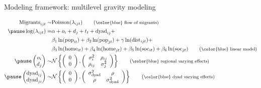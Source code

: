 \documentclass{beamer}
\begin{document}
\begin{frame}[fragile]{Modeling framework: multilevel gravity modeling}
\begin{small}
  \begin{align}
  	\text{Migrants}_{ijt} \sim & \text{Poisson}(\lambda_{ijt})\tag{\footnotesize \color{blue} flow of migrants}\\ \pause
  	\log(\lambda_{ijt}) = & \alpha +   o_i + d_j + t_t + \text{dyad}_{ij}+ \notag \\
  	& \beta_1 \ln(\text{pop}_{it}) + \beta_2
  	\ln(\text{pop}_{jt}) +
  	\gamma \ln(\text{dist}_{ijt}) + \notag \\
  	& \beta_3 \ln(\text{home}_{it}) +
  	\beta_4 \ln(\text{home}_{jt}) +
  	\beta_5 \ln(\text{soc}_{it}) + \beta_6
  	\ln(\text{soc}_{jt})  \tag{\footnotesize \color{blue} linear model} \\ \pause
	\begin{pmatrix}o_i\\
	d_j
\end{pmatrix} \sim &\mathcal{N} \left\{\left(\begin{array}{c}
	0\\
	0
\end{array}\right),
\left(                                        
\begin{array}{cc}
	\sigma^2_i & \rho_{ij} \\
	\rho_{ij} & \sigma^2_{j} 
\end{array}
\right)
\right\} \tag{\footnotesize \color{blue} regional varying effects} \\ \pause
	\begin{pmatrix}\text{dyad}_{ij}\\
	\text{dyad}_{ji}
\end{pmatrix} \sim & \mathcal{N} \left\{\left(\begin{array}{c}
	0\\
	0
\end{array}\right),
\left(                                        
\begin{array}{cc}
	\sigma^2_{\text{dyad}} & \rho \\
	\rho & \sigma^2_{\text{dyad}} 
\end{array}
\right)
\right\} \tag{\footnotesize \color{blue} dyad varying effects} 
\end{align}
\end{small}
\end{frame}
\end{document}
